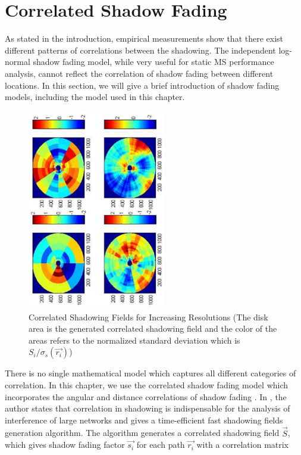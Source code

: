 \section{Correlated Shadow Fading}
\label{sec:Shadow}
As stated in the introduction, empirical measurements show that there exist different patterns of correlations between the shadowing. The independent log-normal shadow fading model, while very useful for static MS performance analysis, cannot reflect the correlation of shadow fading between different locations. In this section, we will give a brief introduction of shadow fading models, including the model used in this chapter.
\begin{figure}
\centering
\includegraphics[width=6cm,angle=270]{shadowingfield_V3.eps}
\caption{Correlated Shadowing Fields for Increasing Resolutions (The disk area is the generated correlated shadowing field and the color of the areas refers to the normalized standard deviation which is $S_{i}/\sigma_{s}(\vec{r_{i}})$)}
\label{shadowingfield}
\end{figure}
There is no single mathematical model which captures all different categories of correlation\cite{szyszkowicz2010feasibility}. In this chapter, we use the correlated shadow fading model which incorporates the angular and distance correlations of shadow fading \cite{szyszkowicz2011interference}. In \cite{szyszkowicz2011interference}, the author states that correlation in shadowing is indispensable for the analysis of interference of large networks and gives a time-efficient fast shadowing fields generation algorithm. The algorithm generates a correlated shadowing field $\vec{S}$, which gives shadow fading factor $\vec{s_{i}}$ for each path $\vec{r_{i}}$ with a correlation matrix

